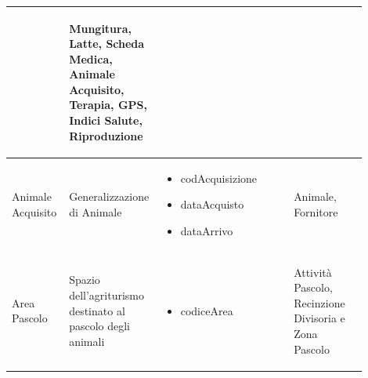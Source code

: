 \documentclass[12pt,a4paper]{article}
\begin{document}
\begin{center}
\begin{longtable}{|p{0.14\linewidth}|p{0.20\linewidth}|p{0.36\linewidth}|p{0.20\linewidth}|}
\begin{itemize}
					\end{itemize}
					& \begin{flushleft}\vspace{-25pt} Mungitura, Latte, Scheda Medica, Animale Acquisito, Terapia, GPS, Indici Salute, Riproduzione \end{flushleft}\\ 

\hline
Animale Acquisito 	& \begin{flushleft}\vspace{-25pt}Generalizzazio\-ne di Animale \end{flushleft}
					& \begin{itemize}
						\setlength{\itemindent}{-1em}
						\vspace{-25pt}
						\setlength\itemsep{-0.25em}
						\item codAcquisizione
						\item dataAcquisto
						\item dataArrivo
						
					\end{itemize}
					& \begin{flushleft}\vspace{-25pt} Animale, Fornitore \end{flushleft} \\ 

\hline
Area Pa\-sco\-lo 		& \begin{flushleft}\vspace{-25pt} Spazio dell'agriturismo destinato al pascolo degli animali \end{flushleft}
					& \begin{itemize}
						\setlength{\itemindent}{-1em}
						\vspace{-25pt}
						\setlength\itemsep{-0.25em}
						\item codiceArea
					\end{itemize}
					& \begin{flushleft}\vspace{-25pt} Attività Pascolo, Recinzione Divisoria e Zona Pascolo \end{flushleft}\\


\end{longtable}
\end{center}
\end{document}
